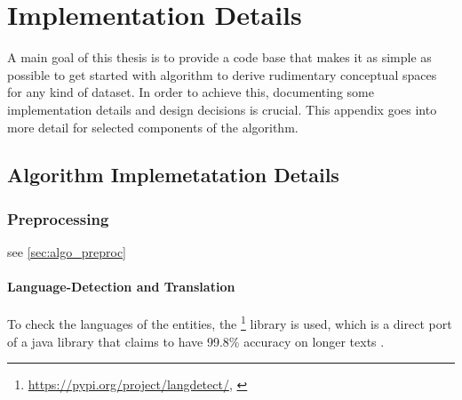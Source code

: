 




\chapter{Implementation Details} %

A main goal of this thesis is to provide a code base that makes it as simple as possible to get started with  algorithm to derive rudimentary conceptual spaces for any kind of dataset. In order to achieve this, documenting some implementation details and design decisions is crucial.
This appendix goes into more detail for selected components of the algorithm.

\label{AppendixB} 

\section{Algorithm Implemetatation Details}

\subsection*{Preprocessing}

see \autoref{sec:algo_preproc}

\subsubsection*{Language-Detection and Translation}
\label{ap:translating}

To check the languages of the entities, the \footnote{\url{https://pypi.org/project/langdetect/}, \textcite{nakatani2010langdetect}} library is used, which is a direct port of a java library that claims to have 99.8\% accuracy on longer texts \cite{nakatani2010langdetect}. 
\newline

